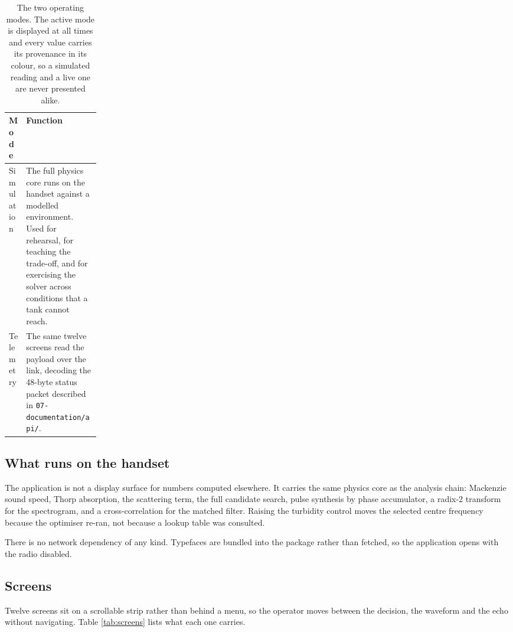 \documentclass[11pt,a4paper]{article}
\begin{document}
\begin{table}[htbp]
\centering
\small
\begin{tabularx}{\linewidth}{L{0.18\linewidth}Y}
\toprule
\textbf{Mode} & \textbf{Function} \\
\midrule
Simulation & The full physics core runs on the handset against a modelled
             environment. Used for rehearsal, for teaching the trade-off, and
             for exercising the solver across conditions that a tank cannot
             reach. \\
Telemetry & The same twelve screens read the payload over the link, decoding
            the 48-byte status packet described in
            \texttt{07-documentation/api/}. \\
\bottomrule
\end{tabularx}
\caption{The two operating modes. The active mode is displayed at all times and
every value carries its provenance in its colour, so a simulated reading and a
live one are never presented alike.}
\label{tab:modes}
\end{table}

\subsection{What runs on the handset}

The application is not a display surface for numbers computed elsewhere. It
carries the same physics core as the analysis chain: Mackenzie sound speed,
Thorp absorption, the scattering term, the full candidate search, pulse
synthesis by phase accumulator, a radix-2 transform for the spectrogram, and a
cross-correlation for the matched filter. Raising the turbidity control moves
the selected centre frequency because the optimiser re-ran, not because a
lookup table was consulted.

There is no network dependency of any kind. Typefaces are bundled into the
package rather than fetched, so the application opens with the radio disabled.

\subsection{Screens}

Twelve screens sit on a scrollable strip rather than behind a menu, so the
operator moves between the decision, the waveform and the echo without
navigating. Table \ref{tab:screens} lists what each one carries.
\end{document}
